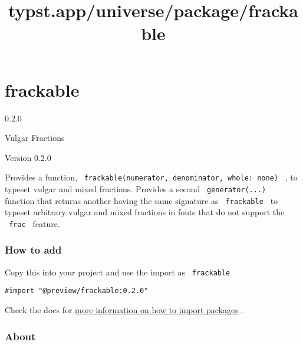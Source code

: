 \title{typst.app/universe/package/frackable}

\label{banner}
\section{frackable}\label{frackable}

{ 0.2.0 }

Vulgar Fractions

\label{readme}
Version 0.2.0

Provides a function,
\texttt{\ frackable(numerator,\ denominator,\ whole:\ none)\ } , to
typeset vulgar and mixed fractions. Provides a second
\texttt{\ generator(...)\ } function that returns another having the
same signature as \texttt{\ frackable\ } to typeset arbitrary vulgar and
mixed fractions in fonts that do not support the \texttt{\ frac\ }
feature.

\begin{Shaded}
\begin{Highlighting}[]

\end{Highlighting}
\end{Shaded}


\subsubsection{How to add}\label{how-to-add}

Copy this into your project and use the import as \texttt{\ frackable\ }

\begin{verbatim}
#import "@preview/frackable:0.2.0"
\end{verbatim}



Check the docs for
\href{https://typst.app/docs/reference/scripting/\#packages}{more
information on how to import packages} .

\subsubsection{About}\label{about}

